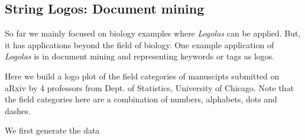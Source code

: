 \documentclass[12pt]{article}\usepackage[]{graphicx}\usepackage[usenames,dvipsnames]{color}
\newcommand{\Logolas}{\textit{Logolas}}
\begin{document}
\newpage

\subsection{String Logos:  Document mining}

So far we mainly focused on biology examples where \Logolas{} can be applied. But,
it has applications beyond the field of biology. One example application of \Logolas{} is in document mining and representing keywords or tags as logos.

Here we build a logo plot of the field categories of manuscipts submitted on aRxiv by 4 professors from Dept. of Statistics, University of Chicago. Note that the field categories here are a combination of numbers, alphabets, dots and dashes.

We first generate the data
\end{document}
